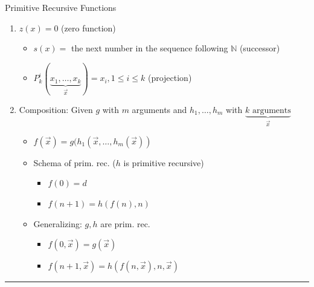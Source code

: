 \documentclass[11pt]{article}
\begin{document}
Primitive Recursive Functions
\begin{enumerate}
\item \(z(x)=0\) (zero function)
\begin{itemize}
\item \(s(x)=\) the next number in the sequence following \(\mathbb{N}\) (successor)
\item \(P_k^i(\underbrace{x_1,\ldots,x_k}_{\vec{x}})=x_i, 1\leq i \leq k\) (projection)
\end{itemize}
\item Composition: Given \(g\) with \(m\) arguments and \(h_1,\ldots,h_m\) with \(\underbrace{k \text{ arguments}}_{\vec{x}}\)
\begin{itemize}
\item \(f(\vec{x})=g(h_1(\vec{x},\ldots,h_m(\vec{x}))\)
\item Schema of prim. rec. (\(h\) is primitive recursive)
\begin{itemize}
\item \(f(0)=d\)
\item \(f(n+1)=h(f(n),n)\)
\end{itemize}
\item Generalizing: \(g,h\) are prim. rec.
\begin{itemize}
\item \(f(0, \vec{x})=g(\vec{x})\)
\item \(f(n+1, \vec{x})=h(f(n,\vec{x}),n,\vec{x})\)
\end{itemize}
\end{itemize}
\end{enumerate}

\noindent\rule{\textwidth}{0.5pt}
\end{document}
